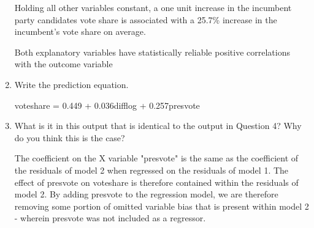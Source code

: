 \documentclass[12pt,letterpaper]{article}
\begin{document}
\begin{enumerate}
		Holding all other variables constant, a one unit increase in the incumbent party candidates vote share is associated with a 25.7\% increase in the incumbent's vote share on average. 
		
		Both explanatory variables have statistically reliable positive correlations with the outcome variable
		
		\item Write the prediction equation.
		
		voteshare = 0.449 + 0.036difflog + 0.257presvote	
		\vspace*{2cm}
		\item What is it in this output that is identical to the output in Question 4? Why do you think this is the case?
		\vspace*{0.5cm}
		\noindent
		
		The coefficient on the X variable "presvote" is the same as the coefficient of the residuals of model 2 when regressed on the residuals of model 1. The effect of presvote on voteshare is therefore contained within the residuals of model 2. By adding presvote to the regression model, we are therefore  removing some portion of omitted variable bias that is present within model 2 - wherein presvote was not included as a regressor.
		

	\end{enumerate}
\end{document}
